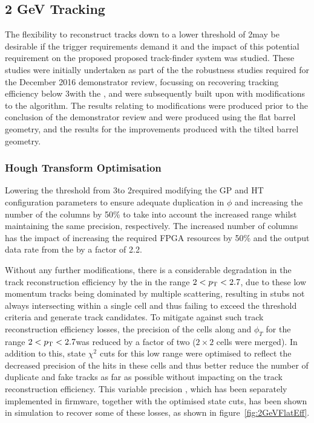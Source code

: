 \subsection{2 GeV Tracking}\label{subsec:Tmtt2GeV}
The flexibility to reconstruct tracks down to a lower \pT threshold of 2\GeV may be desirable if the trigger requirements demand it and the impact of this potential requirement on the proposed proposed track-finder system was studied.
These studies were initially undertaken as part of the the robustness studies required for the December 2016 demonstrator review, focussing on recovering tracking efficiency below 3\GeV with the \HT, and were subsequently built upon with modifications to the \KF algorithm. 
The results relating to \HT modifications were produced prior to the conclusion of the demonstrator review and were produced using the flat barrel geometry, and the results for the \KF improvements produced with the tilted barrel geometry.

\subsubsection{Hough Transform Optimisation}\label{subsubsec:lowPtOptHT}
Lowering the \HT \pT threshold from 3\GeV to 2\GeV required modifying the GP and HT configuration parameters to ensure adequate duplication in $\phi$ and increasing the number of the \qpt columns by 50\% to take into account the increased \pt range whilst maintaining the same precision, respectively.
The increased number of \qpt columns has the impact of increasing the required FPGA resources by 50\% and the output data rate from the \HT by a factor of 2.2.

Without any further modifications, there is a considerable degradation in the track reconstruction efficiency by the \HT in the range $2 < p_{\mathrm{T}} < 2.7$\GeVc, due to these low momentum tracks being dominated by multiple scattering, resulting in stubs not always intersecting within a single \HT cell and thus failing to exceed the threshold criteria and generate track candidates.
To mitigate against such track reconstruction efficiency losses, the precision of the \HT cells along \qpt and $\phi_{T}$ for the range $2 < p_{\mathrm{T}} < 2.7$\GeVc was reduced by a factor of two (\ie $2 \times 2$ cells were merged).
In addition to this, \KF state $\chi^2$ cuts for this low \pT range were optimised to reflect the decreased precision of the hits in these \HT cells and thus better reduce the number of duplicate and fake tracks as far as possible without impacting on the \HT track reconstruction efficiency.
This variable precision \HT, which has been separately implemented in firmware, together with the optimised \KF state cuts, has been shown in simulation to recover some of these losses, as shown in figure~\ref{fig:2GeVFlatEff}.

